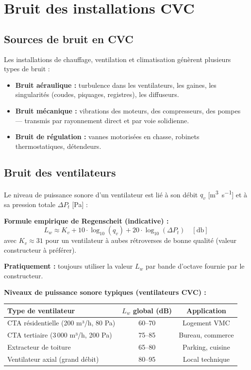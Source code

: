 \section{Bruit des installations CVC}

\subsection{Sources de bruit en CVC}

Les installations de chauffage, ventilation et climatisation génèrent plusieurs types de bruit :

\begin{itemize}
  \item \textbf{Bruit aéraulique :} turbulence dans les ventilateurs, les gaines, les singularités (coudes, piquages, registres), les diffuseurs.
  \item \textbf{Bruit mécanique :} vibrations des moteurs, des compresseurs, des pompes — transmis par rayonnement direct et par voie solidienne.
  \item \textbf{Bruit de régulation :} vannes motorisées en chasse, robinets thermostatiques, détendeurs.
\end{itemize}

\subsection{Bruit des ventilateurs}

Le niveau de puissance sonore d'un ventilateur est lié à son débit $q_v$ [\si{\metre\cubed\per\second}] et à sa pression totale $\Delta P_t$ [\si{\pascal}] :

\begin{methode}
\textbf{Formule empirique de Regenscheit (indicative) :}
\[
  L_w \approx K_v + 10 \cdot \log_{10}(q_v) + 20 \cdot \log_{10}(\Delta P_t) \quad [\si{\decibel}]
\]
avec $K_v \approx 31$ pour un ventilateur à aubes rétroverses de bonne qualité (valeur constructeur à préférer).

\textbf{Pratiquement :} toujours utiliser la valeur $L_w$ par bande d'octave fournie par le constructeur.
\end{methode}

\textbf{Niveaux de puissance sonore typiques (ventilateurs CVC) :}

\begin{center}
\begin{tabular}{lcc}
\toprule
Type de ventilateur & $L_w$ global (dB) & Application \\
\midrule
CTA résidentielle (200 m³/h, 80 Pa) & 60--70 & Logement VMC \\
CTA tertiaire (3\,000 m³/h, 200 Pa) & 75--85 & Bureau, commerce \\
Extracteur de toiture & 65--80 & Parking, cuisine \\
Ventilateur axial (grand débit) & 80--95 & Local technique \\
\bottomrule
\end{tabular}
\end{center}


